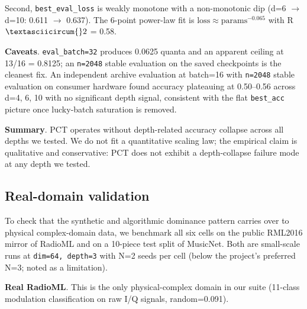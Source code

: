 \documentclass[11pt,a4paper]{article}
\theoremstyle{plain}
\theoremstyle{definition}
\begin{document}
Second, \texttt{best\_eval\_loss} is weakly monotone with a non-monotonic dip (d=6 $\rightarrow$ d=10: 0.611 $\rightarrow$ 0.637). The 6-point power-law fit is $\mathrm{loss} \approx \mathrm{params}^{-0.065}$ with R$\textasciicircum{}2$ = 0.58.

\textbf{Caveats}. \texttt{eval\_batch=32} produces 0.0625 quanta and an apparent ceiling at 13/16 = 0.8125; an \texttt{n=2048} stable evaluation on the saved checkpoints is the cleanest fix. An independent archive evaluation at batch=16 with \texttt{n=2048} stable evaluation on consumer hardware found accuracy plateauing at 0.50--0.56 across d=4, 6, 10 with no significant depth signal, consistent with the flat \texttt{best\_acc} picture once lucky-batch saturation is removed.

\textbf{Summary}. PCT operates without depth-related accuracy collapse across all depths we tested. We do not fit a quantitative scaling law; the empirical claim is qualitative and conservative: PCT does not exhibit a depth-collapse failure mode at any depth we tested.

\subsection{Real-domain validation}
To check that the synthetic and algorithmic dominance pattern carries over to physical complex-domain data, we benchmark all six cells on the public RML2016 mirror of RadioML and on a 10-piece test split of MusicNet. Both are small-scale runs at \texttt{dim=64, depth=3} with N=2 seeds per cell (below the project's preferred N=3; noted as a limitation).

\textbf{Real RadioML}. This is the only physical-complex domain in our suite (11-class modulation classification on raw I/Q signals, random=0.091).
\end{document}
